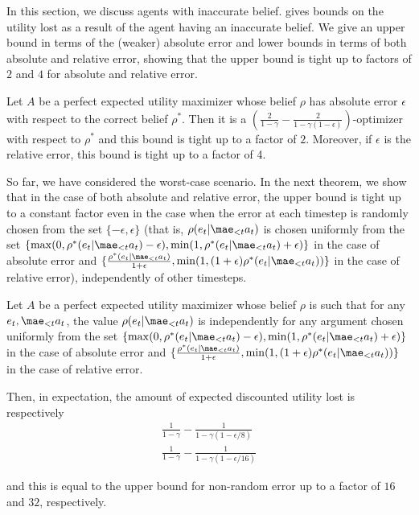 In this section, we discuss agents with inaccurate belief.  gives bounds on the utility lost as a result of the agent having an inaccurate belief. We give an upper bound in terms of the (weaker) absolute error and lower bounds in terms of both absolute and relative error, showing that the upper bound is tight up to factors of $2$ and $4$ for absolute and relative error.

\begin{theorem} \label{thm:inaccurate_belief}
Let $A$ be a perfect expected utility maximizer whose belief $\rho$ has absolute error $\epsilon$ with respect to the correct belief $\rho^*$. Then it is a $(\frac{2}{1-\gamma} - \frac{2}{1- \gamma(1-\epsilon)})$-optimizer with respect to $\rho^*$ and this bound is tight up to a factor of $2$. Moreover, if $\epsilon$ is the relative error, this bound is tight up to a factor of 4.
\end{theorem}

So far, we have considered the worst-case scenario. In the next theorem, we show that in the case of both absolute and relative error, the upper bound is tight up to a constant factor even in the case when the error at each timestep is randomly chosen from the set $\{-\epsilon, \epsilon\}$ (that is, $\rho(e_t|\mae_{<t}a_t)$ is chosen uniformly from the set $\{\max(0,\rho^*(e_t|\mae_{<t}a_t)-\epsilon), \min(1,\rho^*(e_t|\mae_{<t}a_t)+\epsilon)\}$ in the case of absolute error and $\{\frac{\rho^*(e_t|\mae_{<t}a_t)}{1+\epsilon}, \min(1,(1+\epsilon)\rho^*(e_t|\mae_{<t}a_t))\}$ in the case of relative error), independently of other timesteps.

\begin{theorem} \label{thm:avg_case_belief}
Let $A$ be a perfect expected utility maximizer whose belief $\rho$ is such that for any $e_t,\mae_{<t}a_t$, the value $\rho(e_t|\mae_{<t}a_t)$ is independently for any argument chosen uniformly from the set $\{\max(0,\rho^*(e_t|\mae_{<t}a_t)-\epsilon), \min(1,\rho^*(e_t|\mae_{<t}a_t)+\epsilon)\}$ in the case of absolute error and $\{\frac{\rho^*(e_t|\mae_{<t}a_t)}{1+\epsilon}, \min(1,(1+\epsilon)\rho^*(e_t|\mae_{<t}a_t))\}$ in the case of relative error.

Then, in expectation, the amount of expected discounted utility lost is respectively
\begin{gather}
\frac{1}{1-\gamma} - \frac{1}{1- \gamma(1-\epsilon/8)}\\
\frac{1}{1-\gamma} - \frac{1}{1- \gamma(1-\epsilon/16)}
\end{gather}

and this is equal to the upper bound for non-random error up to a factor of $16$ and $32$, respectively.
\end{theorem}

